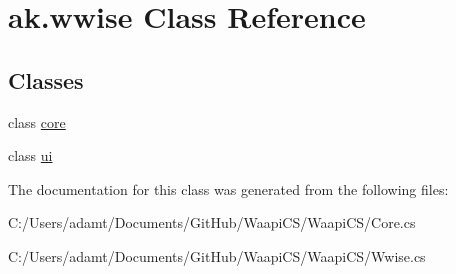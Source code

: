 \hypertarget{classak_1_1wwise}{}\section{ak.\+wwise Class Reference}
\label{classak_1_1wwise}
\subsection*{Classes}
\begin{DoxyCompactItemize}
\item 
class \mbox{\hyperlink{classak_1_1wwise_1_1core}{core}}
\item 
class \mbox{\hyperlink{classak_1_1wwise_1_1ui}{ui}}
\end{DoxyCompactItemize}


The documentation for this class was generated from the following files\+:\begin{DoxyCompactItemize}
\item 
C\+:/\+Users/adamt/\+Documents/\+Git\+Hub/\+Waapi\+C\+S/\+Waapi\+C\+S/Core.\+cs\item 
C\+:/\+Users/adamt/\+Documents/\+Git\+Hub/\+Waapi\+C\+S/\+Waapi\+C\+S/Wwise.\+cs\end{DoxyCompactItemize}
